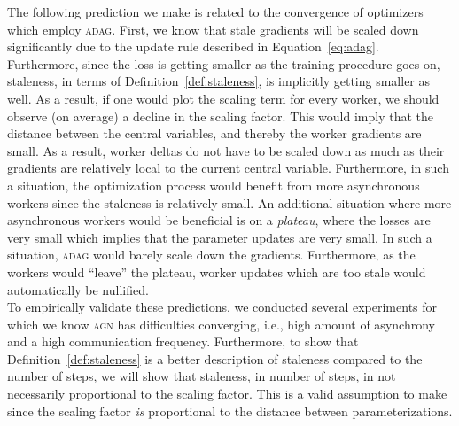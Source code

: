 The following prediction we make is related to the convergence of optimizers which employ \textsc{adag}. First, we know that stale gradients will be scaled down significantly due to the update rule described in Equation~\ref{eq:adag}. Furthermore, since the loss is getting smaller as the training procedure goes on, staleness, in terms of Definition~\ref{def:staleness}, is implicitly getting smaller as well. As a result, if one would plot the scaling term for every worker, we should observe (on average) a decline in the scaling factor. This would imply that the distance between the central variables, and thereby the worker gradients are small. As a result, worker deltas do not have to be scaled down as much as their gradients are relatively local to the current central variable. Furthermore, in such a situation, the optimization process would benefit from more asynchronous workers since the staleness is relatively small. An additional situation where more asynchronous workers would be beneficial is on a \emph{plateau}, where the losses are very small which implies that the parameter updates are very small. In such a situation, \textsc{adag} would barely scale down the gradients. Furthermore, as the workers would ``leave'' the plateau, worker updates which are too stale would automatically be nullified.\\

To empirically validate these predictions, we conducted several experiments for which we know \textsc{agn} has difficulties converging, i.e., high amount of asynchrony and a high communication frequency. Furthermore, to show that Definition~\ref{def:staleness} is a better description of staleness compared to the number of steps, we will show that staleness, in number of steps, in not necessarily proportional to the scaling factor. This is a valid assumption to make since the scaling factor \emph{is} proportional to the distance between parameterizations.

